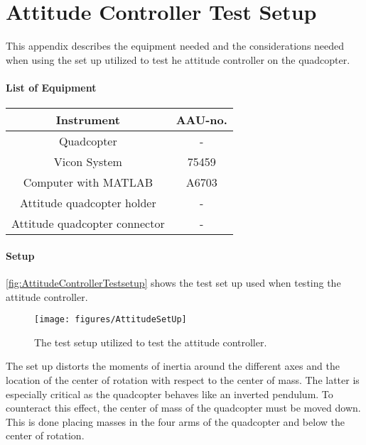 \chapter{Attitude Controller Test Setup}\label{app:AttitudeControllerTest} 
This appendix describes the equipment needed and the considerations needed when using the set up utilized to test he attitude controller on the quadcopter.
\subsubsection{List of Equipment}
\begin{table}[H]
	\centering
	\begin{tabular}{|c|c|}
		\hline%
		\textbf{Instrument}   &  \textbf{AAU-no.}  \\
		\hline%
		Quadcopter    	&  - 					  \\
		\hline%
		Vicon System 			& 75459             \\   
		\hline%
		Computer with MATLAB       &  A6703		\\
		\hline%
		Attitude quadcopter holder      &  -		\\
		\hline%
		Attitude quadcopter connector    &  -	\\
		\hline%
	\end{tabular}
\end{table}
\subsubsection{Setup}

\autoref{fig:AttitudeControllerTestsetup} shows the test set up used when testing the attitude controller.

\begin{figure}[H]
	\centering
	\texttt{[image: figures/AttitudeSetUp]}
	\caption{The test setup utilized to test the attitude controller.}
	\label{fig:AttitudeControllerTestsetup}
\end{figure}

The set up distorts the moments of inertia around the different axes and the location of the center of rotation with respect to the center of mass. The latter is especially critical as the quadcopter behaves like an inverted pendulum. To counteract this effect, the center of mass of the quadcopter must be moved down. This is done placing masses in the four arms of the quadcopter and below the center of rotation. 

